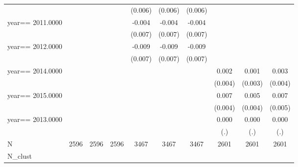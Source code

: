 \begin{table}[htbp]
\begin{tabular}{l*{9}{c}}
                    &               &               &               &     (0.006)   &     (0.006)   &     (0.006)   &               &               &               \\
year==  2011.0000   &               &               &               &      -0.004   &      -0.004   &      -0.004   &               &               &               \\
                    &               &               &               &     (0.007)   &     (0.007)   &     (0.007)   &               &               &               \\
year==  2012.0000   &               &               &               &      -0.009   &      -0.009   &      -0.009   &               &               &               \\
                    &               &               &               &     (0.007)   &     (0.007)   &     (0.007)   &               &               &               \\
year==  2014.0000   &               &               &               &               &               &               &       0.002   &       0.001   &       0.003   \\
                    &               &               &               &               &               &               &     (0.004)   &     (0.003)   &     (0.004)   \\
year==  2015.0000   &               &               &               &               &               &               &       0.007   &       0.005   &       0.007   \\
                    &               &               &               &               &               &               &     (0.004)   &     (0.004)   &     (0.005)   \\
year==  2013.0000   &               &               &               &               &               &               &       0.000   &       0.000   &       0.000   \\
                    &               &               &               &               &               &               &         (.)   &         (.)   &         (.)   \\
\hline
N                   &        2596   &        2596   &        2596   &        3467   &        3467   &        3467   &        2601   &        2601   &        2601   \\
N\_clust             &               &               &               &               &               &               &               &               &               \\

\end{tabular}
\end{table}
